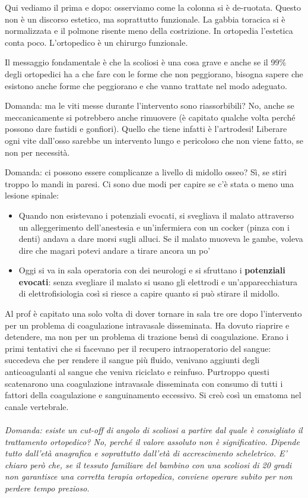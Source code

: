 Qui vediamo il prima e dopo: osserviamo come la colonna si è de-ruotata.
Questo non è un discorso estetico, ma soprattutto funzionale. La gabbia toracica si è normalizzata e il polmone risente meno della costrizione.
In ortopedia l'estetica conta poco. L'ortopedico è un chirurgo funzionale.

Il messaggio fondamentale è che la scoliosi è una cosa grave e anche se il 99\% degli ortopedici ha a che fare con le forme che non peggiorano, bisogna sapere che esistono anche forme che peggiorano e che vanno trattate nel modo adeguato.

Domanda: ma le viti messe durante l'intervento sono riassorbibili? No, anche se meccanicamente si potrebbero anche rimuovere (è capitato qualche volta perché possono dare fastidi e gonfiori). Quello che tiene infatti è l'artrodesi! Liberare ogni vite dall'osso sarebbe un
intervento lungo e pericoloso che non viene fatto, se non per necessità.

Domanda: ci possono essere complicanze a livello di midollo osseo? Sì, se stiri troppo lo mandi in paresi. Ci sono due modi per capire se c'è stata o meno una lesione spinale:

\begin{itemize}
\item
  Quando non esistevano i potenziali evocati, si svegliava il malato attraverso un alleggerimento dell'anestesia e un'infermiera con un cocker (pinza con i denti) andava a dare morsi sugli alluci. Se il malato muoveva le gambe, voleva dire che magari potevi andare a tirare ancora un po'
\item
  Oggi si va in sala operatoria con dei neurologi e si sfruttano i \textbf{potenziali evocati}: senza svegliare il malato si usano gli elettrodi e un'apparecchiatura di elettrofisiologia così si riesce a capire quanto si può stirare il midollo.
\end{itemize}

Al prof è capitato una solo volta di dover tornare in sala tre ore dopo l'intervento per un problema di coagulazione intravasale disseminata. Ha dovuto riaprire e detendere, ma non per un problema di trazione bensì di coagulazione. Erano i primi tentativi che si facevano per il recupero
intraoperatorio del sangue: succedeva che per rendere il sangue più fluido, venivano aggiunti degli anticoagulanti al sangue che veniva riciclato e reinfuso. Purtroppo questi scatenarono una coagulazione intravasale disseminata con consumo di tutti i fattori della coagulazione e sanguinamento eccessivo. Si creò così un ematoma nel
canale vertebrale.
\\\\
\emph{Domanda: esiste un cut-off di angolo di scoliosi a partire dal quale è consigliato il trattamento ortopedico? No, perché il valore assoluto non è significativo. Dipende tutto dall'età anagrafica e soprattutto dall'età di accrescimento scheletrico. E' chiaro però che, se il tessuto familiare del bambino con una scoliosi di 20 gradi non garantisce una corretta terapia ortopedica, conviene operare subito per non perdere tempo prezioso.}


